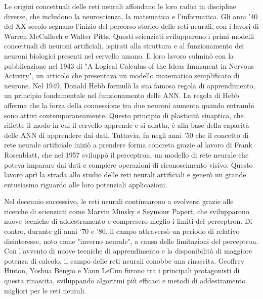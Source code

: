 
Le origini concettuali delle reti neurali affondano le loro radici in discipline diverse, che includono la neuroscienza, la matematica e l'informatica.
Gli anni '40 del XX secolo segnano l'inizio del percorso storico delle reti neurali, con i lavori di Warren McCulloch e Walter Pitts. Questi scienziati
svilupparono i primi modelli concettuali di neuroni artificiali, ispirati alla struttura e al funzionamento dei neuroni biologici presenti nel cervello
umano. Il loro lavoro culminò con la pubblicazione nel 1943 di "A Logical Calculus of the Ideas Immanent in Nervous Activity", un articolo che presentava
un modello matematico semplificato di neurone.
Nel 1949, Donald Hebb formulò la sua famosa regola di apprendimento, un principio fondamentale nel funzionamento delle ANN. La regola di Hebb afferma che
la forza della connessione tra due neuroni aumenta quando entrambi sono attivi contemporaneamente. Questo principio di plasticità sinaptica, che riflette
il modo in cui il cervello apprende e si adatta, è alla base della capacità delle ANN di apprendere dai dati.
Tuttavia, fu negli anni '50 che il concetto di rete neurale artificiale iniziò a prendere forma concreta grazie al lavoro di Frank Rosenblatt, che nel
1957 sviluppò il perceptron, un modello di rete neurale che poteva imparare dai dati e compiere operazioni di riconoscimento visivo. Questo lavoro aprì
la strada allo studio delle reti neurali artificiali e generò un grande entusiasmo riguardo alle loro potenziali applicazioni.

Nel decennio successivo, le reti neurali continuarono a evolversi grazie alle ricerche di scienziati come Marvin Minsky e Seymour Papert, che svilupparono
nuove tecniche di addestramento e compresero meglio i limiti del perceptron. Di contro, durante gli anni '70 e '80, il campo attraversò un periodo di
relativo disinteresse, noto come "inverno neurale", a causa delle limitazioni del perceptron.
Con l'avvento di nuove tecniche di apprendimento e la disponibilità di maggiore potenza di calcolo, il campo delle reti neurali conobbe una rinascita.
Geoffrey Hinton, Yoshua Bengio e Yann LeCun furono tra i principali protagonisti di questa rinascita, sviluppando algoritmi più efficaci e metodi di
addestramento migliori per le reti neurali.

